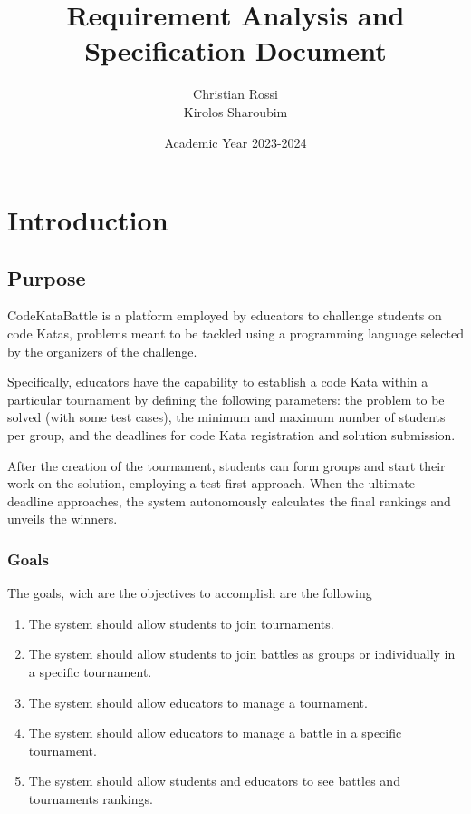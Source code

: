\documentclass[12pt, a4paper]{report}
\title{Requirement Analysis and Specification Document}
\author{Christian Rossi \\ Kirolos Sharoubim}
\date{Academic Year 2023-2024}
\begin{document}
\maketitle

\newpage

\tableofcontents

\newpage

\chapter{Introduction}
    \section{Purpose}
    CodeKataBattle is a platform employed by educators to challenge students on code Katas, problems meant to be tackled using a programming language selected by 
    the organizers of the challenge.
    
    Specifically, educators have the capability to establish a code Kata within a particular tournament by defining the following parameters: the problem to be solved 
    (with some test cases), the minimum and maximum number of students per group, and the deadlines for code Kata registration and solution submission.
    
    After the creation of the tournament, students can form groups and start their work on the solution, employing a test-first approach. When the ultimate deadline 
    approaches, the system autonomously calculates the final rankings and unveils the winners.

    \subsection{Goals}
    The goals, wich are the objectives to accomplish are the following
    \begin{enumerate}
        \item The system should allow students to join tournaments.
        \item The system should allow students to join battles as groups or individually in a specific tournament.
        \item The system should allow educators to manage a tournament.
        \item The system should allow educators to manage a battle in a specific tournament.
        \item The system should allow students and educators to see battles and tournaments rankings.
    \end{enumerate}
\end{document}
